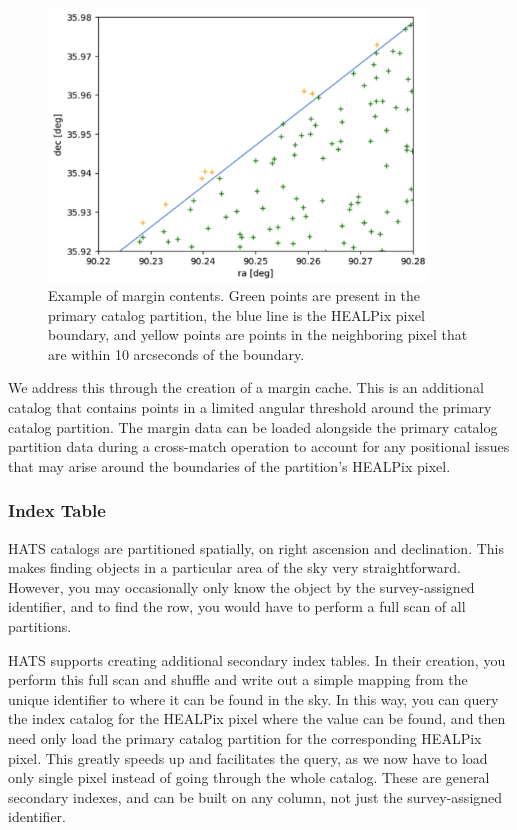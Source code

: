 \documentclass[11pt,a4paper]{ivoa}
\begin{document}
\begin{figure}
\centering
\includegraphics[width=0.9\textwidth]{margin-pix.png}
\caption{Example of margin contents. Green points are present in the primary catalog partition, the blue line is the HEALPix pixel boundary, and yellow points are points in the neighboring pixel that are within 10 arcseconds of the boundary.}
\label{fig:margin}
\end{figure}

We address this through the creation of a margin cache.
This is an additional catalog that contains points in a limited angular threshold around the primary catalog partition.
The margin data can be loaded alongside the primary catalog partition data during a cross-match operation to account for any positional issues that may arise around the boundaries of the partition's HEALPix pixel.

\subsubsection{Index Table} \label{sec:index}

HATS catalogs are partitioned spatially, on right ascension and declination. 
This makes finding objects in a particular area of the sky very straightforward. 
However, you may occasionally only know the object by the survey-assigned identifier, and to find the row, you would have to perform a full scan of all partitions. \par

HATS supports creating additional secondary index tables. 
In their creation, you perform this full scan and shuffle and write out a simple mapping from the unique identifier to where it can be found in the sky.
In this way, you can query the index catalog for the HEALPix pixel where the value can be found, and then need only load the primary catalog partition for the corresponding HEALPix pixel. 
This greatly speeds up and facilitates the query, as we now have to load only single pixel instead of going through the whole catalog.
These are general secondary indexes, and can be built on any column, not just the survey-assigned identifier.
\end{document}
